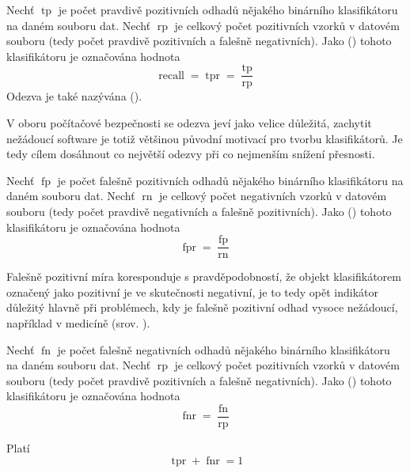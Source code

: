 \begin{define}
	Nechť \( \operatorname{tp} \) je počet pravdivě pozitivních odhadů nějakého binárního klasifikátoru na daném souboru dat. Nechť \( \operatorname{rp} \) je celkový počet pozitivních vzorků v datovém souboru (tedy počet pravdivě pozitivních a falešně negativních). Jako  () tohoto klasifikátoru je označována hodnota
	\[ \operatorname{recall} = \operatorname{tpr} = \frac{\operatorname{tp}}{\operatorname{rp}} \]
	Odezva je také nazývána  ().
\end{define}

V oboru počítačové bezpečnosti se odezva jeví jako velice důležitá, zachytit nežádoucí software je totiž většinou původní motivací pro tvorbu klasifikátorů. Je tedy cílem dosáhnout co největší odezvy při co nejmenším snížení přesnosti.

\begin{define}
	Nechť \( \operatorname{fp} \) je počet falešně pozitivních odhadů nějakého binárního klasifikátoru na daném souboru dat. Nechť \( \operatorname{rn} \) je celkový počet negativních vzorků v datovém souboru (tedy počet pravdivě negativních a falešně pozitivních). Jako  () tohoto klasifikátoru je označována hodnota
	\[ \operatorname{fpr} = \frac{\operatorname{fp}}{\operatorname{rn}} \]
\end{define}

Falešně pozitivní míra koresponduje s pravděpodobností, že objekt klasifikátorem označený jako pozitivní je ve skutečnosti negativní, je to tedy opět indikátor důležitý hlavně při problémech, kdy je falešně pozitivní odhad vysoce nežádoucí, například v medicíně (srov. \cite{mac_namee_problem_2002}).

\begin{define}
	Nechť \( \operatorname{fn} \) je počet falešně negativních odhadů nějakého binárního klasifikátoru na daném souboru dat. Nechť \( \operatorname{rp} \) je celkový počet pozitivních vzorků v datovém souboru (tedy počet pravdivě pozitivních a falešně negativních). Jako  () tohoto klasifikátoru je označována hodnota
	\[ \operatorname{fnr} = \frac{\operatorname{fn}}{\operatorname{rp}} \]
\end{define}

\begin{theorem}\label{tpr+fnr}
	Platí
	\[ \operatorname{tpr} + \operatorname{fnr} = 1 \]
\end{theorem}

